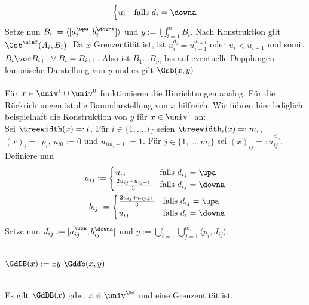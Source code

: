 \begin{bew}
\begin{align*}
\begin{cases}
                u_i & \text{falls $d_i = \downa$}
            \end{cases}
    \end{align*}
    Setze nun $B_i := \langle [a_i^\upa, b_i^\downa] \rangle$ und $y := \bigcup_{i=1}^m B_i$.
    Nach Konstruktion gilt $\Gsb^\einf(A_i, B_i)$.
    Da $x$ Grenzentität ist, ist $u_{i}^{d_i} = u_{i+1}^{d_{i+1}}$ oder $u_i < u_{i+1}$ und somit   $B_i \vor B_{i+1} \lor B_i = B_{i+1}$.
    Also ist $B_1 ... B_m$ bis auf eventuelle Dopplungen kanonische Darstellung von $y$ und es gilt $\Gsb(x,y)$.\\ \ \\
    Für $x \in \univ^1 \cup \univ^0$ funktionieren die Hinrichtungen analog. Für die Rückrichtungen ist die Baumdarstellung von $x$ hilfreich. Wir führen hier lediglich beispielhaft die Konstruktion von $y$ für $x \in \univ^1$ an:\\
    Sei $\treewidth(x) =: l$.
    Für $i \in \{1, ..., l\}$ seien $\treewidth_i(x) =: m_i$, $(x)_i =: p_i$, $u_{i0} := 0$ und $u_{im_i+1} := 1$.
    Für $j \in \{1, ..., m_i\}$ sei $(x)_{ij} =: u_{ij}^{d_{ij}}$.
    Definiere nun
    \begin{align*}
        a_{ij} := 
            \begin{cases}
                u_{ij} & \text{falls $d_{ij} = \upa$}\\
                \frac{2u_{ij} + u_{ij-1}}{3} & \text{falls $d_{ij} = \downa$}
            \end{cases}\\
        b_{ij} := 
            \begin{cases}
                \frac{2u_{ij} + u_{ij+1}}{3} & \text{falls $d_{ij} = \upa$}\\
                u_{ij} & \text{falls $d_i = \downa$}
            \end{cases}
    \end{align*}
    Setze nun $J_{ij} := [a_{ij}^\upa, b_{ij}^\downa]$ und $y := \bigcup_{i=1}^{l} \bigcup_{j=1}^{m_i} \langle p_i,J_{ij} \rangle$.
\end{bew}



\begin{erin}\ \\
    $\GdDB(x) := \exists y\ \Gddb(x,y)$
\end{erin}

\begin{hyp}\ \\
    Es gilt $\GdDB(x)$ gdw. $x \in \univ^{\Gd}$ und eine Grenzentität ist.
\end{hyp}

